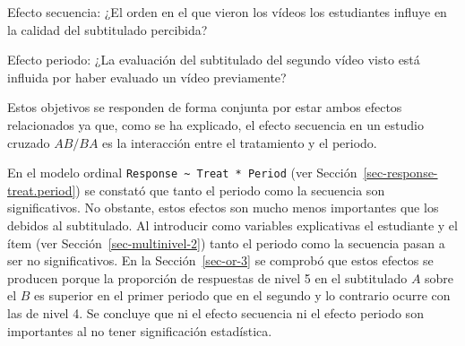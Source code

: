 \documentclass[
  12pt,
  a4paper,
  extrafontsizes,
  onecolumn,
  openright,
  table]{memoir}
\begin{document}
\begin{tcolorbox}[enhanced jigsaw, arc=.35mm, bottomrule=.15mm, left=2mm, colframe=quarto-callout-tip-color-frame, coltitle=black, colback=white, rightrule=.15mm, opacityback=0, breakable, leftrule=.75mm, colbacktitle=quarto-callout-tip-color!10!white, opacitybacktitle=0.6, bottomtitle=1mm, toptitle=1mm, titlerule=0mm, title=\textcolor{quarto-callout-tip-color}{\faLightbulb}\hspace{0.5em}{Objetivo específico}, toprule=.15mm]

Efecto secuencia: ¿El orden en el que vieron los vídeos los estudiantes
influye en la calidad del subtitulado percibida?

\end{tcolorbox}

\begin{tcolorbox}[enhanced jigsaw, arc=.35mm, bottomrule=.15mm, left=2mm, colframe=quarto-callout-tip-color-frame, coltitle=black, colback=white, rightrule=.15mm, opacityback=0, breakable, leftrule=.75mm, colbacktitle=quarto-callout-tip-color!10!white, opacitybacktitle=0.6, bottomtitle=1mm, toptitle=1mm, titlerule=0mm, title=\textcolor{quarto-callout-tip-color}{\faLightbulb}\hspace{0.5em}{Objetivo específico}, toprule=.15mm]

Efecto periodo: ¿La evaluación del subtitulado del segundo vídeo visto
está influida por haber evaluado un vídeo previamente?

\end{tcolorbox}

Estos objetivos se responden de forma conjunta por estar ambos efectos
relacionados ya que, como se ha explicado, el efecto secuencia en un
estudio cruzado \(AB/BA\) es la interacción entre el tratamiento y el
periodo.

En el modelo ordinal
\texttt{Response\ \textasciitilde{}\ Treat\ *\ Period} (ver
Sección~\ref{sec-response-treat.period}) se constató que tanto el
periodo como la secuencia son significativos. No obstante, estos efectos
son mucho menos importantes que los debidos al subtitulado. Al
introducir como variables explicativas el estudiante y el ítem (ver
Sección~\ref{sec-multinivel-2}) tanto el periodo como la secuencia pasan
a ser no significativos. En la Sección~\ref{sec-or-3} se comprobó que
estos efectos se producen porque la proporción de respuestas de nivel 5
en el subtitulado \(A\) sobre el \(B\) es superior en el primer periodo
que en el segundo y lo contrario ocurre con las de nivel 4. Se concluye
que ni el efecto secuencia ni el efecto periodo son importantes al no
tener significación estadística.
\end{document}
